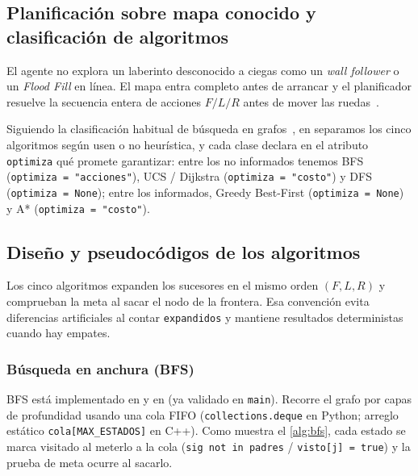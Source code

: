 \subsection{Planificación sobre mapa conocido y clasificación de algoritmos}
\label{subsec:enfoque-taxonomia}

El agente no explora un laberinto desconocido a ciegas como un \textit{wall follower} o un \textit{Flood Fill} en línea. El mapa entra completo antes de arrancar y el planificador resuelve la secuencia entera de acciones $F/L/R$ antes de mover las ruedas~\cite{arquitectura2026doc}.

Siguiendo la clasificación habitual de búsqueda en grafos~\cite{russell2021aima}, en  separamos los cinco algoritmos según usen o no heurística, y cada clase declara en el atributo \texttt{optimiza} qué promete garantizar: entre los no informados tenemos BFS (\texttt{optimiza = "acciones"}), UCS / Dijkstra (\texttt{optimiza = "costo"}) y DFS (\texttt{optimiza = None}); entre los informados, Greedy Best-First (\texttt{optimiza = None}) y A* (\texttt{optimiza = "costo"}).

\subsection{Diseño y pseudocódigos de los algoritmos}
\label{subsec:algoritmos-detalle}

Los cinco algoritmos expanden los sucesores en el mismo orden $(F, L, R)$ y comprueban la meta al sacar el nodo de la frontera. Esa convención evita diferencias artificiales al contar \texttt{expandidos} y mantiene resultados deterministas cuando hay empates.

\subsubsection{Búsqueda en anchura (BFS)}

BFS está implementado en  y en  (ya validado en \texttt{main}). Recorre el grafo por capas de profundidad usando una cola FIFO (\texttt{collections.deque} en Python; arreglo estático \texttt{cola[MAX\_ESTADOS]} en C++). Como muestra el \cref{alg:bfs}, cada estado se marca visitado al meterlo a la cola (\texttt{sig not in padres} / \texttt{visto[j] = true}) y la prueba de meta ocurre al sacarlo.

